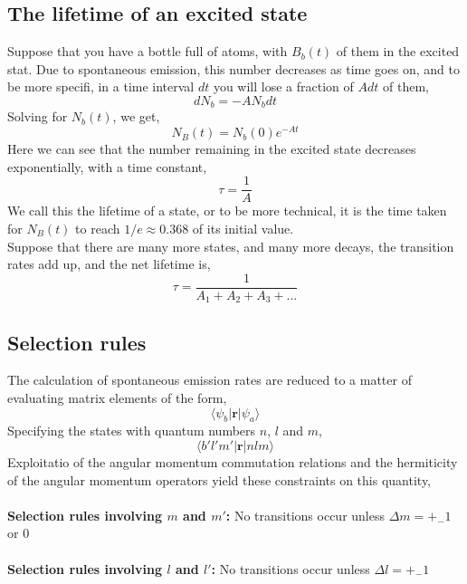 \subsection{The lifetime of an excited state}
Suppose that you have a bottle full of atoms, with $B_b(t)$ of them in the excited stat. Due to spontaneous emission, this number decreases as time goes on, and to be more specifi, in a time interval $dt$ you will lose a fraction of $Adt$ of them,
\begin{equation}
	dN_b=-AN_bdt
\end{equation}	
Solving for $N_b(t)$, we get,
\begin{equation}
	N_B(t)=N_b(0)e^{-At}
\end{equation}
Here we can see that the number remaining in the excited state decreases exponentially, with a time constant,
\begin{equation}
	\tau=\frac{1}{A}
\end{equation}
We call this the lifetime of a state, or to be more technical, it is the time taken for $N_B(t)$ to reach $1/e\approx0.368$ of its initial value.\\
Suppose that there are many more states, and many more decays, the transition rates add up, and the net lifetime is,
\begin{equation}
	\tau=\frac{1}{A_1+A_2+A_3+...}
\end{equation}

\subsection{Selection rules}
The calculation of spontaneous emission rates are reduced to a matter of evaluating matrix elements of the form,
\begin{equation*}
	\langle\psi_b|\textbf{r}|\psi_a\rangle
\end{equation*}
Specifying the states with quantum numbers $n$, $l$ and $m$,	
\begin{equation}
	\langle b'l'm'|\textbf{r}|nlm\rangle
\end{equation}
Exploitatio of the angular momentum commutation relations and the hermiticity of the angular momentum operators yield these constraints on this quantity,\\
\\
\textbf{Selection rules involving $m$ and $m'$:} No transitions occur unless $\Delta m=+_-1$ or $0$\\
\\
\textbf{Selection rules involving $l$ and $l'$:} No transitions occur unless $\Delta l=+_-1$










